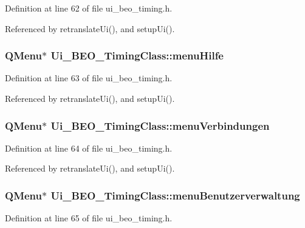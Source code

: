 Definition at line 62 of file ui\_\-beo\_\-timing.h.

Referenced by retranslateUi(), and setupUi().\hypertarget{class_ui___b_e_o___timing_class_d6638f230c96a963025511e7837dc3a7}{
\subsubsection[menuHilfe]{\setlength{\rightskip}{0pt plus 5cm}QMenu$\ast$ {\bf Ui\_\-BEO\_\-TimingClass::menuHilfe}}}
\label{class_ui___b_e_o___timing_class_d6638f230c96a963025511e7837dc3a7}




Definition at line 63 of file ui\_\-beo\_\-timing.h.

Referenced by retranslateUi(), and setupUi().\hypertarget{class_ui___b_e_o___timing_class_a9c026ecb9e30cae0c32ed73b1dcad65}{
\subsubsection[menuVerbindungen]{\setlength{\rightskip}{0pt plus 5cm}QMenu$\ast$ {\bf Ui\_\-BEO\_\-TimingClass::menuVerbindungen}}}
\label{class_ui___b_e_o___timing_class_a9c026ecb9e30cae0c32ed73b1dcad65}




Definition at line 64 of file ui\_\-beo\_\-timing.h.

Referenced by retranslateUi(), and setupUi().\hypertarget{class_ui___b_e_o___timing_class_d5fc0b0efd6ae01875016c94b7f067c9}{
\subsubsection[menuBenutzerverwaltung]{\setlength{\rightskip}{0pt plus 5cm}QMenu$\ast$ {\bf Ui\_\-BEO\_\-TimingClass::menuBenutzerverwaltung}}}
\label{class_ui___b_e_o___timing_class_d5fc0b0efd6ae01875016c94b7f067c9}




Definition at line 65 of file ui\_\-beo\_\-timing.h.

